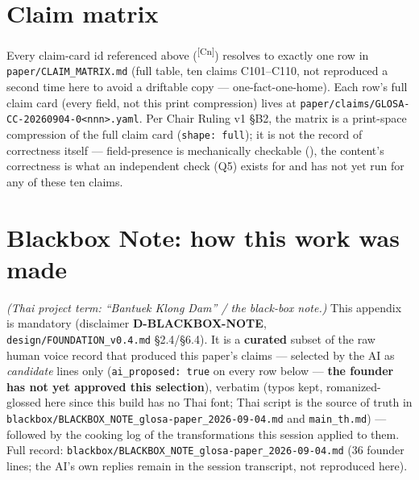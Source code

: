 \documentclass[11pt]{article}
\newcommand{\claimref}[1]{\textsuperscript{[#1]}}
\begin{document}
\appendix

\section{Claim matrix}
\label{sec:claim-matrix}
Every claim-card id referenced above (\claimref{Cn}) resolves to exactly one row in
\texttt{paper/CLAIM\_MATRIX.md} (full table, ten claims C101--C110, not reproduced a second time
here to avoid a driftable copy --- one-fact-one-home). Each row's full claim card (every field, not
this print compression) lives at \texttt{paper/claims/GLOSA-CC-20260904-0<nnn>.yaml}. Per Chair
Ruling v1 \S B2, the matrix is a print-space compression of the full claim card
(\texttt{shape: full}); it is not the record of correctness itself --- field-presence is
mechanically checkable (), the content's correctness is what an independent
check (Q5) exists for and has not yet run for any of these ten claims.

\section{Blackbox Note: how this work was made}
\label{sec:blackbox}
\emph{(Thai project term: ``Bantuek Klong Dam'' / the black-box note.)} This appendix is mandatory
(disclaimer \textbf{D-BLACKBOX-NOTE}, \texttt{design/FOUNDATION\_v0.4.md} \S2.4/\S6.4). It is a
\textbf{curated} subset of the raw human voice record that produced this paper's claims ---
selected by the AI as \emph{candidate} lines only (\texttt{ai\_proposed: true} on every row below
--- \textbf{the founder has not yet approved this selection}), verbatim (typos kept, romanized-
glossed here since this build has no Thai font; Thai script is the source of truth in
\texttt{blackbox/BLACKBOX\_NOTE\_glosa-paper\_2026-09-04.md} and \texttt{main\_th.md}) ---
followed by the cooking log of the transformations this session applied to them. Full record:
\texttt{blackbox/BLACKBOX\_NOTE\_glosa-paper\_2026-09-04.md} (36 founder lines; the AI's own
replies remain in the session transcript, not reproduced here).
\end{document}
